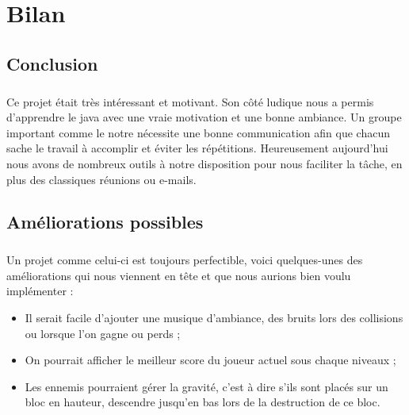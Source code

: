 \documentclass[a4paper,12pt]{report}
\begin{document}
\chapter{Bilan}
\section{Conclusion}
\paragraph{}Ce projet était très intéressant et motivant. Son côté ludique nous a permis d'apprendre le java avec une vraie motivation et une bonne ambiance. Un groupe important comme le notre nécessite une bonne communication afin que chacun sache le travail à accomplir et éviter les répétitions. Heureusement aujourd'hui nous avons de nombreux outils à notre disposition pour nous faciliter la tâche, en plus des classiques réunions ou e-mails.

\section{Améliorations possibles}
\paragraph{}Un projet comme celui-ci est toujours perfectible, voici quelques-unes des améliorations qui nous viennent en tête et que nous aurions bien voulu implémenter :
\begin{itemize}
\item Il serait facile d'ajouter une musique d'ambiance, des bruits lors des collisions ou lorsque l'on gagne ou perds ;
\item On pourrait afficher le meilleur score du joueur actuel sous chaque niveaux ;
\item Les ennemis pourraient gérer la gravité, c'est à dire s'ils sont placés sur un bloc en hauteur, descendre jusqu'en bas lors de la destruction de ce bloc.
\end{itemize}
\end{document}
